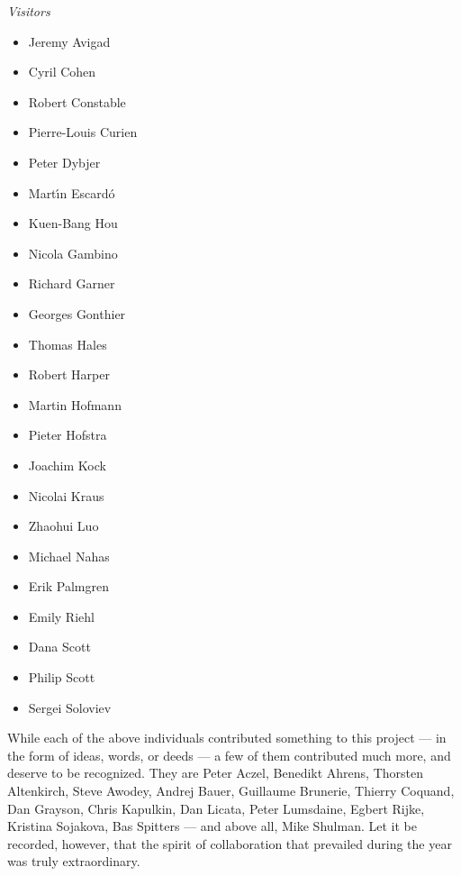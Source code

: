 {%
\centerline{\emph{Visitors}}
%
\begin{multicols}{3}{
\begin{itemize}
\item[] Jeremy Avigad
\item[] Cyril Cohen
\item[] Robert Constable
\item[] Pierre-Louis Curien
\item[] Peter Dybjer
\item[] Mart{\'\i}n Escard{\'o}
\item[] Kuen-Bang Hou
\item[] Nicola Gambino
\item[] Richard Garner
\item[] Georges Gonthier
\item[] Thomas Hales
\item[] Robert Harper
\item[] Martin Hofmann
\item[] Pieter Hofstra
\item[] Joachim Kock
\item[] Nicolai Kraus
\item[] Zhaohui Luo
\item[] Michael Nahas
\item[] Erik Palmgren
\item[] Emily Riehl
\item[] Dana Scott
\item[] Philip Scott
\item[] Sergei Soloviev
\end{itemize}
}
\end{multicols}

\noindent While each of the above individuals contributed something to this project --- in the form of ideas, words, or deeds --- a few of them contributed much more, and deserve to be recognized.  They are Peter Aczel, Benedikt Ahrens, Thorsten Altenkirch,  Steve Awodey, Andrej Bauer, Guillaume Brunerie, Thierry Coquand, Dan Grayson, Chris Kapulkin, Dan Licata, Peter Lumsdaine, Egbert Rijke, Kristina Sojakova, Bas Spitters --- and above all, Mike Shulman.  Let it be recorded, however, that the spirit of collaboration that prevailed during the year was truly extraordinary. 


}
